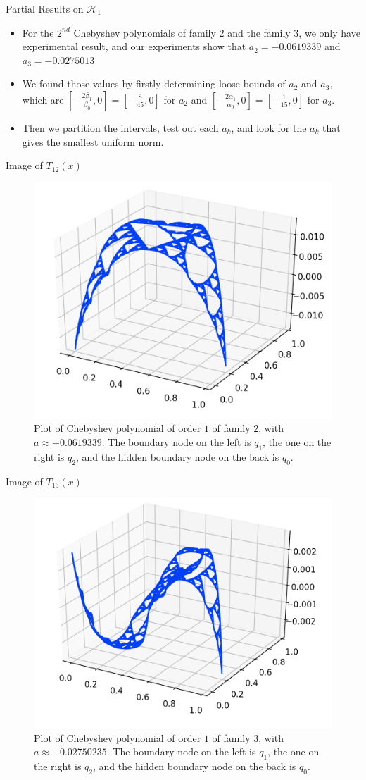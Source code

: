 \documentclass[xcolor = dvipsnames]{beamer}
\begin{document}
\begin{frame}{Partial Results on $\mathcal{H}_1$}
    \begin{itemize}
        \item For the $2^{nd}$ Chebyshev polynomials of family $2$ and the family $3$, we only have experimental result, and our experiments show that $a_{2} = −0.0619339$ and $a_{3} = −0.0275013$
        \item We found those values by firstly determining loose bounds of $a_{2}$ and $a_{3}$, which are $[-\frac{2\beta_{1}}{\beta_{0}}, 0]=[-\frac{8}{45}, 0]$ for $a_{2}$ and $[-\frac{2\alpha_{1}}{\alpha_{0}}, 0]=[-\frac{1}{15}, 0]$ for $a_{3}$.
        \item Then we partition the intervals, test out each $a_{k}$, and look for the $a_{k}$ that gives the smallest uniform norm.
   \end{itemize}
\end{frame}

\begin{frame}{Image of $T_{12}(x)$}
    \begin{figure}[H]
    \centering
    \includegraphics[width=.4\textwidth]{images/chebyshev_p12_0_0619339.png}
    \caption{Plot of Chebyshev polynomial of order $1$ of family $2$, with $a\approx -0.0619339$. The boundary node on the left is $q_{1}$, the one on the right is $q_{2}$, and the hidden boundary node on the back is $q_{0}$.}
    \end{figure}
\end{frame}

\begin{frame}{Image of $T_{13}(x)$}
    \begin{figure}[H]
    \centering
    \includegraphics[width=.4\textwidth]{images/chebyshev_p13_0_02750235.png}
    \caption{Plot of Chebyshev polynomial of order $1$ of family $3$, with $a\approx -0.02750235$. The boundary node on the left is $q_{1}$, the one on the right is $q_{2}$, and the hidden boundary node on the back is $q_{0}$.}
    \end{figure}
\end{frame}
\end{document}

